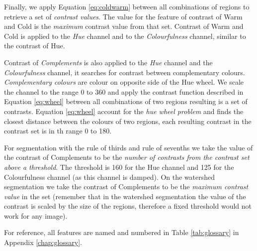 \documentclass[11pt,a4paper,twoside,openright]{report}
\begin{document}
Finally, we apply Equation \ref{eq:coldwarm} between all combinations of
regions to retrieve a set of \emph{contrast values}.  The value for the feature
of contrast of Warm and Cold is the \emph{maximum} contrast value from that
set.  Contrast of Warm and Cold is applied to the \emph{Hue} channel and to the
\emph{Colourfulness} channel, similar to the contrast of Hue.

Contrast of \emph{Complements} is also applied to the \emph{Hue} channel and
the \emph{Colourfulness} channel, it searches for contrast between
complementary colours.  \emph{Complementary colours} are colour on opposite
side of the Hue wheel.  We scale the channel to the range 0 to 360 and apply
the contrast function described in Equation \ref{eq:wheel} between all
combinations of two regions resulting is a set of contrasts.  Equation
\ref{eq:wheel} account for the \emph{hue wheel problem} and finds the closest
distance between the colours of two regions, each resulting contrast in the
contrast set is in th range 0 to 180.

For segmentation with the rule of thirds and rule of sevenths we take the value
of the contrast of Complements to be the \emph{number of contrasts from the
contrast set above a threshold}.  The threshold is 160 for the Hue channel and
125 for the Colourfulness channel (as this channel is damped).  On the
watershed segmentation we take the contrast of Complements to be the
\emph{maximum contrast value} in the set (remember that in the watershed
segmentation the value of the contrast is scaled by the size of the regions,
therefore a fixed threshold would not work for any image).

For reference, all features are named and numbered in Table \ref{tab:glossary}
in Appendix \ref{chap:glossary}.

\end{document}
